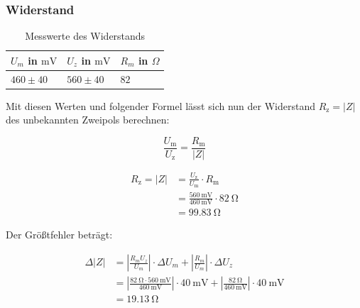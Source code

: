         \subsubsection{Widerstand}
         \label{sec:Versuch2_Widerstand}

            \begin{table}[H]
                \centering
                \caption{Messwerte des Widerstands}
                \vspace{1em}
                \begin{tabular}{|l|l|l|}
                    \hline
                    $U_m$ in $\mathrm{mV}$ & $U_z$ in $\mathrm{mV}$ & $R_{m}$ in $\Omega$\\
                    \hline
                    \hline
                    $460 \pm 40$ & $560 \pm 40$ & $82$\\
                    \hline
                \end{tabular}
                \label{tab:Versuch2_Widerstand}
            \end{table}

            Mit diesen Werten und folgender Formel lässt sich nun der Widerstand $R_{\mathrm{z}} = |Z|$ des unbekannten Zweipols berechnen:

            \begin{equation}
                \frac{U_{\mathrm{m}}}{U_{\mathrm{z}}} = \frac{R_{\mathrm{m}}}{|Z|}
                \label{eq:Versuch2_Widerstand_Formel}
            \end{equation}
            
            \begin{equation}
                \begin{aligned}
                    R_{\mathrm{z}} = |Z| &= \frac{U_{\mathrm{z}}}{U_{\mathrm{m}}} \cdot R_{\mathrm{m}}\\
                                   &= \frac{560\ \mathrm{mV}}{460\ \mathrm{mV}} \cdot 82\ \mathrm{\Omega}\\
                                   &= 99.83\ \mathrm{\Omega}
                \end{aligned}
                \label{eq:Versuch2_Widerstand}
            \end{equation}

            Der Größtfehler beträgt:

            \begin{equation}
                \begin{aligned}
                    \Delta |Z| &= \left|\frac{R_{m} U_{z}}{U_{m}} \right| \cdot \Delta U_{m} + \left|\frac{R_{m}}{U_{m}} \right| \cdot \Delta U_{z}\\
                               &= \left|\frac{82\ \mathrm{\Omega} \cdot 560\ \mathrm{mV}}{460\ \mathrm{mV}} \right| \cdot 40\ \mathrm{mV} + \left|\frac{82\ \mathrm{\Omega}}{460\ \mathrm{mV}} \right| \cdot 40\ \mathrm{mV}\\
                               &= 19.13\ \mathrm{\Omega}
                \end{aligned}
                \label{eq:Versuch2_Widerstand_Fehler}
            \end{equation}

